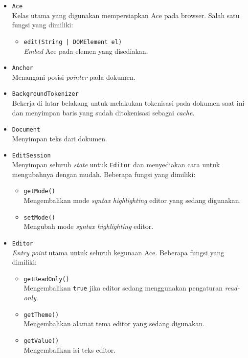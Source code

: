 \begin{itemize}
    \item \verb|Ace| \\ Kelas utama yang digunakan mempersiapkan Ace pada browser. Salah satu fungsi yang dimiliki:
        \begin{itemize}
            \item \texttt{edit(String | DOMElement el)} \\ \textit{Embed} Ace pada elemen yang disediakan.
        \end{itemize}
    \item \verb|Anchor| \\ Menangani posisi \textit{pointer} pada dokumen.
    \item \verb|BackgroundTokenizer| \\ Bekerja di latar belakang untuk melakukan tokenisasi pada dokumen saat ini dan menyimpan baris yang sudah ditokenisasi sebagai \textit{cache}.
    \item \verb|Document| \\ Menyimpan teks dari dokumen. 
    \item \verb|EditSession| \\ Menyimpan seluruh \textit{state} untuk \verb|Editor| dan menyediakan cara untuk mengubahnya dengan mudah. Beberapa fungsi yang dimiliki:
        \begin{itemize}
            \item \verb|getMode()| \\ Mengembalikan mode \textit{syntax highlighting} editor yang sedang digunakan.
            \item \verb|setMode()| \\ Mengubah mode \textit{syntax highlighting} editor.
        \end{itemize}
    \item \verb|Editor| \\ \textit{Entry point} utama untuk seluruh kegunaan Ace. Beberapa fungsi yang dimiliki:
        \begin{itemize}
            \item \verb|getReadOnly()| \\ Mengembalikan \verb|true| jika editor sedang menggunakan pengaturan \textit{read-only}.
            \item \verb|getTheme()| \\ Mengembalikan alamat tema editor yang sedang digunakan.
            \item \verb|getValue()| \\ Mengembalikan isi teks editor.

\end{itemize}
\end{itemize}
